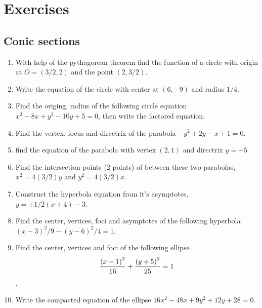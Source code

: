 \documentclass[../main-exe.tex]{subfiles}
\begin{document}
\section{Exercises}

\subsection{Conic sections}
\begin{enumerate}
    \item With help of the pythagorean theorem find the function of a circle with origin at $O=(3/2,2)$ and the point $(2,3/2)$.
    \item Write the equation of the circle with center at $(6,-9)$ and radius $1/4$.
    \item Find the origing, radius of the following circle equation $x^2-8x+y^2-10y+5=0$, then write the factored equation.

    \item Find the vertex, focus and directrix of the parabola $-y^2+2y-x+1=0$.
    \item find the equation of the parabola with vertex $(2,1)$ and directrix $y=-5$
    \item Find the intersection points (2 points) of between these two parabolas, $x^2=4(3/2)y$ and $y^2=4(3/2)x$.

    \item Construct the hyperbola equation from it's asymptotes, $y = \pm 1/2(x+4)-3$.
    \item Find the center, vertices, foci and asymptotes of the following hyperbola $(x-3)^2/9-(y-6)^2/4=1$.

    \item Find the center, vertices and foci of the following ellipse \[\frac{\qty(x-1)^2}{16} + \frac{\qty(y+5)^2}{25} = 1\].
    \item Write the compacted equation of the ellipse $16x^2-48x+9y^2+12y+28=0$.
\end{enumerate}
\end{document}
